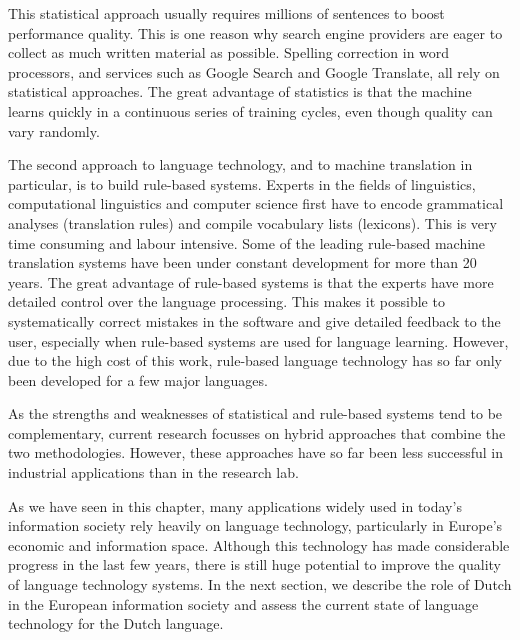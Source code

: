 \begin{multicols}{2}
This statistical approach usually requires millions of sentences to boost performance quality. This is one reason why search engine providers are eager to collect as much written material as possible. Spelling correction in word processors, and services such as Google Search and Google Translate, all rely on statistical approaches. The great advantage of statistics is that the machine learns quickly in a continuous series of training cycles, even though quality can vary randomly.

The second approach to language technology, and to machine translation in particular, is to build rule-based systems. Experts in the fields of linguistics, computational linguistics and computer science first have to encode grammatical analyses (translation rules) and compile vocabulary lists (lexicons). This is very time consuming and labour intensive. Some of the leading rule-based machine translation systems have been under constant development for more than 20 years. The great advantage of rule-based systems is that the experts have more detailed control over the language processing. This makes it possible to systematically correct mistakes in the software and give detailed feedback to the user, especially when rule-based systems are used for language learning. However, due to the high cost of this work, rule-based language technology has so far only been developed for a few major languages.


As the strengths and weaknesses of statistical and rule-based systems tend to be complementary, current research focusses on hybrid approaches that combine the two methodologies. However, these approaches have so far been less successful in industrial applications than in the research lab.

As we have seen in this chapter, many applications widely used in today’s information society rely heavily on language technology, particularly in Europe’s economic and information space. Although this technology has made considerable progress in the last few years, there is still huge potential to improve the quality of language technology systems. In the next section, we describe the role of Dutch in the European information society and assess the current state of language technology for the Dutch language.
\end{multicols}

\clearpage


